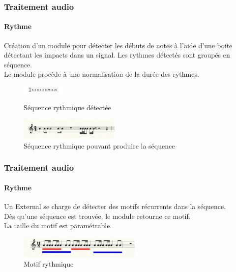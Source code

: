 \documentclass{beamer}
\begin{document}
\begin{frame}
\frametitle{Traitement audio}
\framesubtitle{Rythme}
Création d'un module pour détecter les débuts de notes à l'aide d'une boite détectant les impacts dans un signal.
\newline
\newline
Les rythmes détectés sont groupés en séquence.\\
Le module procède à une normalisation de la durée des rythmes.
\begin{figure}
\centering
\includegraphics[height=15px]{rythme.jpg}
\caption{Séquence rythmique détectée}
\includegraphics[height=40px]{structurerythme.jpg}
\caption{Séquence rythmique pouvant produire la séquence}
\end{figure}
\end{frame}

\begin{frame}
\frametitle{Traitement audio}
\framesubtitle{Rythme}
Un External se charge de détecter des motifs récurrents dans la séquence.\\
Dès qu'une séquence est trouvée, le module retourne ce motif.\\
La taille du motif est paramétrable.
\begin{figure}
\centering
\includegraphics[height=40px]{motifrythme.jpg}
\caption{Motif rythmique}
\end{figure}
\end{frame}
\end{document}
